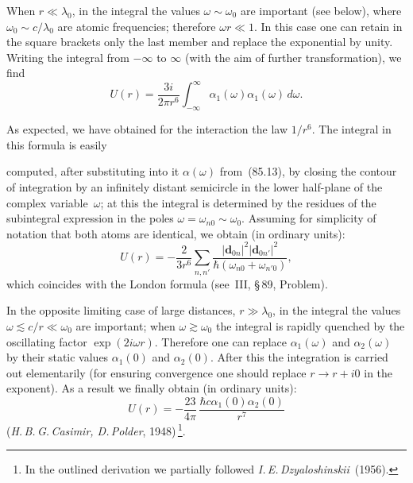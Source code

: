 When $r \ll \lambda_0$, in the integral the values $\omega\sim\omega_0$ are important (see below), where $\omega_0\sim c/\lambda_0$ are atomic frequencies; therefore $\omega r \ll 1$. In this case one can retain in the square brackets only the last member and replace the exponential by unity. Writing the integral from $-\infty$ to $\infty$ (with the aim of further transformation), we find
\begin{equation}
U(r) = \frac{3i}{2\pi r^6}\int_{-\infty}^{\infty}\alpha_1(\omega)\alpha_1(\omega)\,d\omega.
\tag{85.18}
\end{equation}

As expected, we have obtained for the interaction the law $1/r^6$. The integral in this formula is easily

computed, after substituting into it $\alpha(\omega)$ from~(85.13), by closing the contour of integration by an infinitely distant semicircle in the lower half-plane of the complex variable~$\omega$; at this the integral is determined by the residues of the subintegral expression in the poles $\omega = \omega_{n0}\sim\omega_0$. Assuming for simplicity of notation that both atoms are identical, we obtain (in ordinary units):
\begin{equation}
U(r) = -\frac{2}{3r^6}\sum_{n,n'}\frac{|\mathbf{d}_{0n}|^2|\mathbf{d}_{0n'}|^2}{\hbar(\omega_{n0}+\omega_{n'0})},
\tag{85.19}
\end{equation}
which coincides with the London formula (see~III, \S\,89, Problem).

In the opposite limiting case of large distances, $r \gg \lambda_0$, in the integral the values $\omega \lesssim c/r \ll \omega_0$ are important; when $\omega \gtrsim \omega_0$ the integral is rapidly quenched by the oscillating factor $\exp(2i\omega r)$. Therefore one can replace $\alpha_1(\omega)$ and $\alpha_2(\omega)$ by their static values $\alpha_1(0)$ and $\alpha_2(0)$. After this the integration is carried out elementarily (for ensuring convergence one should replace $r \to r + i0$ in the exponent). As a result we finally obtain (in ordinary units):
\begin{equation}
U(r) = -\frac{23}{4\pi}\,\frac{\hbar c\alpha_1(0)\alpha_2(0)}{r^7}
\tag{85.20}
\end{equation}
(\textit{H.\,B.\,G.\,Casimir, D.\,Polder}, 1948)\,\footnote{In the outlined derivation we partially followed \textit{I.\,E.\,Dzyaloshinskii}~(1956).}.
